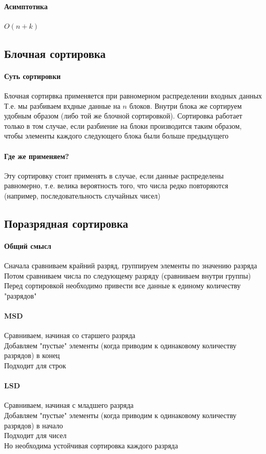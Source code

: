 \documentclass[a4paper,10pt]{article}
\begin{document}
	\paragraph{Асимптотика}
	$O(n+k)$
	\subsection{Блочная сортировка}
	\paragraph{Суть сортировки}
	Блочная сортирвка применяется при равномерном распределении входных данных \\
	Т.е. мы разбиваем вхдные данные на $n$ блоков. Внутри блока же сортируем удобным образом (либо той же блочной сортировкой). Сортировка работает только в том случае, если разбиение на блоки производится таким образом, чтобы элементы каждого следующего блока были больше предыдущего
	\paragraph{Где же применяем?}
	Эту сортировку стоит применять в случае, если данные распределены равномерно, т.е. велика вероятность того, что числа редко повторяются (например, последовательность случайных чисел) \\
	\subsection{Поразрядная сортировка}
	\paragraph{Общий смысл}
	Сначала сравниваем крайний разряд, группируем элементы по значению разряда \\
	Потом сравниваем числа по следующему разряду (сравниваем внутри группы) \\
	Перед сортировкой необходимо привести все данные к единому количеству "разрядов"
	\paragraph{MSD}
	Сравниваем, начиная со старшего разряда \\
	Добавляем "пустые" элементы (когда приводим к одинаковому количеству разрядов) в конец \\
	Подходит для строк \\
	\paragraph{LSD}
	Сравниваем, начиная с младшего разряда \\
	Добавляем "пустые" элементы (когда приводим к одинаковому количеству разрядов) в начало \\
	Подходит для чисел \\
	Но необходима устойчивая сортировка каждого разряда \\
\end{document}
